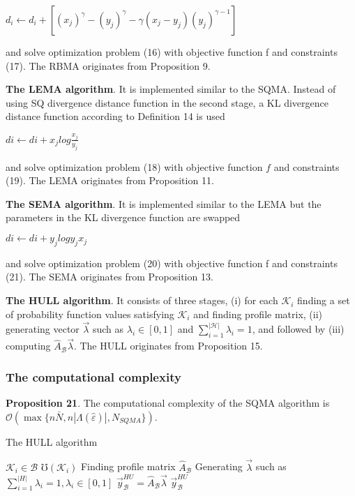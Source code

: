 \documentclass[10pt,a4paper]{IOS-Book-Article}
\begin{document}
$d_i \gets d_i + \left[ (x_j)^\gamma − (y_j)^\gamma − \gamma(x_j − y_j)(y_j)^{\gamma−1} \right]$

and solve optimization problem (16) with objective function f and constraints (17). The RBMA originates from Proposition 
9.

\textbf{The LEMA algorithm}. It is implemented similar 
to the SQMA. Instead of using SQ divergence distance
 function in the second stage, a KL divergence
distance function according to Definition 14 is used 

$di \gets di + x_j log{\frac{x_j}{y_j}}$

and solve optimization problem (18) with objective function $f$ and constraints (19). The LEMA originates from Proposition 11.

\textbf{The SEMA algorithm}. It is implemented similar to the LEMA but the parameters in the KL divergence function are swapped

$di \gets di + y_j log{{y_j}{x_j}}$

and solve optimization problem (20) with objective function f and constraints (21). The SEMA originates from Proposition 13.

\textbf{The HULL algorithm}. It consists of three stages, (i) for each $\mathcal{K}_i$ finding a set of probability function
values satisfying $\mathcal{K}_i$ and finding profile matrix, (ii)
generating vector $\vec{\lambda}$ such as $\lambda_i \in [0, 1]$ and
$\sum^|\mathcal{H}|_{i=1} \lambda_i = 1$, and followed by (iii) computing $\hat{A}_\mathcal{B}\vec{\lambda}$. The HULL originates from Proposition 15.
\subsubsection{The computational complexity}

\textbf{Proposition 21}. The computational complexity of the
SQMA algorithm is $\mathcal{O}(\max\{n \bar{N}, n|\Lambda(\hat{\varepsilon})|,N_{SQMA} \})$.

\begin{algorithm}
\caption{The HULL algorithm}
\begin{algorithmic}[1]
\For $\mathcal{K}_i \in \mathcal{B}$
  \State $\mho(\mathcal{K}_i)$
\EndFor
\State Finding profile matrix $\hat{A}_\mathcal{B}$
\State Generating $\vec{\lambda}$ such as $\sum^|H|_{i=1} \lambda_i = 1, \lambda_i \in [0, 1]$
\State $\vec{y}^{HU}_\mathcal{B} = \hat{A}_\mathcal{B} \vec{\lambda}$
\State \Return $\vec{y}^{HU}_\mathcal{B}$
\end{algorithmic}
\end{algorithm}
\end{document}
